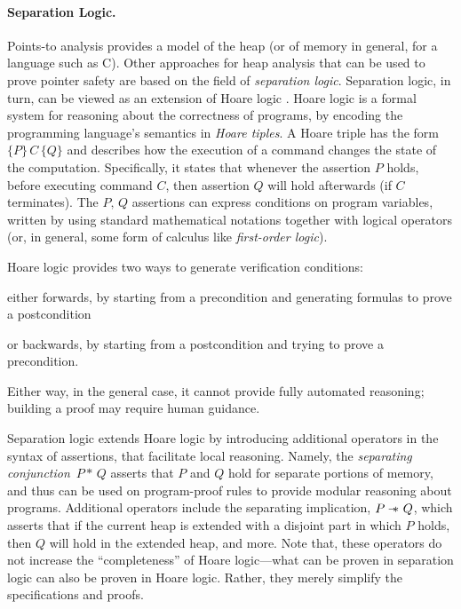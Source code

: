 \paragraph{Separation Logic.}
Points-to analysis provides a model of the heap (or of memory in
general, for a language such as C). Other approaches for heap analysis
that can be used to prove pointer safety are based on the field of
\emph{separation logic}. Separation logic, in turn, can be viewed as
an extension of Hoare logic
\cite{journals/cacm/Hoare69,floyd1967assigning,lics:2002/Reynolds,csl/OHearnRY01}.
Hoare logic is a formal system for reasoning about the correctness of
programs, by encoding the programming language's semantics in
\emph{Hoare tiples}. A Hoare triple has the form \(\{P\}\, C\, \{Q\}\)
and describes how the execution of a command changes the state of the
computation. Specifically, it states that whenever the assertion \(P\)
holds, before executing command \(C\), then assertion \(Q\) will hold
afterwards (if \(C\) terminates). The \(P,\, Q\) assertions can
express conditions on program variables, written by using standard
mathematical notations together with logical operators (or, in
general, some form of calculus like \emph{first-order logic}).

Hoare logic provides two ways to generate verification conditions:
\begin{inparaenum}[(i)]
\item either forwards, by starting from a precondition and
  generating formulas to prove a postcondition
\item or backwards, by starting from a postcondition and trying to
  prove a precondition.
\end{inparaenum}
Either way, in the general case, it cannot provide fully automated
reasoning; building a proof may require human guidance.


Separation logic
\cite{lics:2002/Reynolds,csl/OHearnRY01,popl/IshtiaqO01,Reynolds00intuitionisticreasoning}
extends Hoare logic by introducing additional operators in the syntax
of assertions, that facilitate local reasoning. Namely, the
\emph{separating conjunction} \(\,P * \,Q\) asserts that \(P\) and
\(Q\) hold for separate portions of memory, and thus can be used on
program-proof rules to provide modular reasoning about
programs. Additional operators include the separating implication,
\(P \sep Q\), which asserts that if the current heap is extended with
a disjoint part in which \(P\) holds, then \(Q\) will hold in the
extended heap, and more. Note that, these operators do not increase
the ``completeness'' of Hoare logic---what can be proven in separation
logic can also be proven in Hoare logic. Rather, they merely simplify
the specifications and proofs.

